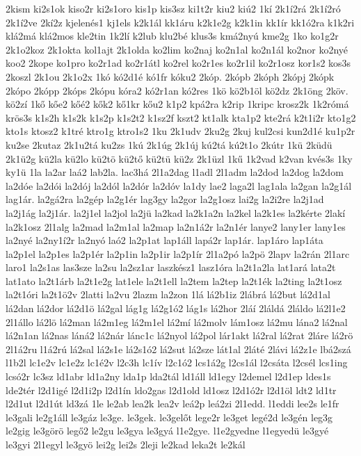 {2kism
ki2s1ok
kiso2r
ki2s1oro
kis1p
kis3sz
ki1t2r
kiu2
kiú2
1kí
2k1í2rá
2k1í2ró
2k1í2ve
2kí2z
kjelenés1
kj1els
k2k1ál
kk1áru
k2k1e2g
k2k1in
kk1ír
kk1ó2ra
k1k2ri
klá2má
klá2mos
kle2tin
1k2lí
k2lub
klu2bé
klus3s
kmá2nyú
kme2g
1ko
ko1g2r
2k1o2koz
2k1okta
kol1ajt
2k1olda
ko2lim
ko2naj
ko2n1al
ko2n1ál
ko2nor
ko2nyé
koo2
2kope
ko1pro
ko2r1ad
ko2r1átl
ko2rel
ko2r1es
ko2r1il
ko2r1osz
kor1s2
kos3s
2koszl
2k1ou
2k1o2x
1kó
kó2d1é
kó1fr
kóku2
2kóp.
2kópb
2kóph
2kópj
2kópk
2kópo
2kópp
2kóps
2kópu
kóra2
kó2r1an
kó2res
1kö
kö2b1öl
kö2dz
2k1öng
2köv.
kö2zí
1kő
kőe2
kőé2
kők2
kő1kr
kőu2
k1p2
kpá2ra
k2rip
1kripc
krosz2k
1k2rómá
krös3s
k1s2h
k1s2k
k1s2p
k1s2t2
k1sz2f
kszt2
kt1alk
kta1p2
kte2rá
k2t1i2r
kto1g2
kto1s
ktosz2
k1tré
ktro1g
ktro1s2
1ku
2k1udv
2ku2g
2kuj
kul2csi
kun2d1é
ku1p2r
ku2se
2kutaz
2k1u2tá
ku2zs
1kú
2k1úg
2k1új
kú2tá
kú2t1o
2kútr
1kü
2küdü
2k1ü2g
kü2la
kü2lo
kü2tö
kü2tő
kü2tü
kü2z
2k1üzl
1kű
1k2vad
k2van
kvés3s
1ky
ky1ü
1la
la2ar
laá2
lab2la.
lac3há
2l1a2dag
l1adl
2l1adm
la2dod
la2dog
la2dom
la2dóe
la2dói
la2dój
la2dól
la2dór
la2dóv
la1dy
lae2
laga2l
lag1ala
la2gan
la2g1ál
lag1ár.
la2gá2ra
la2gép
la2g1ér
lag3gy
la2gor
la2g1osz
lai2g
la2i2re
la2j1ad
la2j1ág
la2j1ár.
la2j1el
la2jol
la2jü
la2kad
la2k1a2n
la2kel
la2k1es
la2kérte
2lakí
la2k1osz
2l1alg
la2mad
la2m1al
la2map
la2n1á2r
la2n1ér
lanye2
lany1er
lany1es
la2nyé
la2ny1í2r
la2nyó
laó2
la2p1at
lap1áll
lapá2r
lap1ár.
lap1áro
lap1áta
la2p1el
la2p1es
la2p1ér
la2p1in
la2p1ir
la2p1ír
2l1a2pó
la2pö
2lapv
la2rán
2l1arc
laro1
la2s1as
las3sze
la2su
la2sz1ar
laszkész1
lasz1óra
la2t1a2la
lat1ará
lata2t
lat1ato
la2t1árb
la2t1e2g
lat1ele
la2t1ell
la2tem
la2tep
la2t1ék
la2ting
la2t1osz
la2t1óri
la2t1ö2v
2latti
la2vu
2lazm
la2zon
1lá
lá2b1iz
2lábrá
lá2but
lá2d1al
lá2dan
lá2dor
lá2d1ö
lá2gal
lág1g
lá2g1ó2
lág1s
lá2hor
2láí
2láldá
2láldo
lá2l1e2
2l1állo
lá2lö
lá2man
lá2m1eg
lá2m1el
lá2mí
lá2molv
lám1osz
lá2mu
lána2
lá2nal
lá2n1an
lá2nas
láná2
lá2nár
lánc1c
lá2nyol
lá2pol
lár1akt
lá2ral
lá2rat
2láre
lá2rö
2l1á2ru
l1á2rú
lá2sal
lá2s1e
lá2s1ó2
lá2sut
lá2sze
lát1al
2láté
2lávi
lá2z1e
lbá2szá
l1b2l
lc1e2v
lc1e2z
lc1é2v
l2c3h
lc1ív
l2c1ó2
lcs1á2g
l2cs1ál
l2csáta
l2csél
lcs1ing
lcsó2r
lc3sz
ld1abr
ld1a2ny
lda1p
lda2tál
ld1áll
ld1egy
l2demel
l2d1ep
ldes1s
lde2tér
l2d1igé
l2d1i2p
l2d1ín
ldo2gas
l2d1old
ld1osz
l2d1ó2r
l2d1öl
ldt2
ld1tr
l2d1ut
l2d1út
ld3zá
1le
le2ab
lea2k
lea2v
leá2p
leá2zi
2l1edd.
l1eddi
lee2s
le1fr
le3gali
le2g1áll
le3gáz
le3ge.
le3gek.
le3gelőt
lege2r
le3get
legé2d
le3gén
leg3g
le2gig
le3görö
legő2
le2gu
le3gya
le3gyá
l1e2gye.
l1e2gyedne
l1egyedü
le3gyé
le3gyi
2l1egyl
le3gyö
lei2g
lei2s
2leji
le2kad
leka2t
le2kál
}
